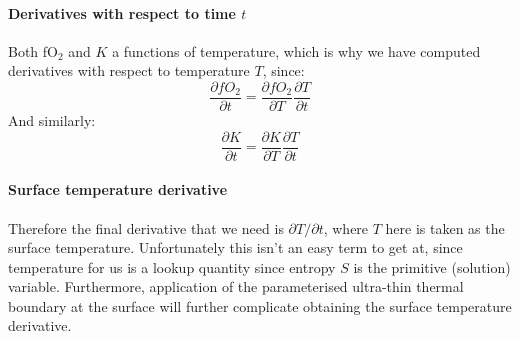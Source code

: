 \paragraph{Derivatives with respect to time $t$}
Both fO$_2$ and $K$ a functions of temperature, which is why we have computed derivatives with respect to temperature $T$, since:
\begin{equation}
\frac{\partial fO_2}{\partial t} = \frac{\partial fO_2}{\partial T} \frac{\partial T}{\partial t}
\end{equation}
And similarly:
\begin{equation}
\frac{\partial K}{\partial t} = \frac{\partial K}{\partial T} \frac{\partial T}{\partial t}
\end{equation}
\paragraph{Surface temperature derivative}
Therefore the final derivative that we need is $\partial T/\partial t$, where $T$ here is taken as the surface temperature.  Unfortunately this isn't an easy term to get at, since temperature for us is a lookup quantity since entropy $S$ is the primitive (solution) variable.  Furthermore, application of the parameterised ultra-thin thermal boundary at the surface will further complicate obtaining the surface temperature derivative.  

%
